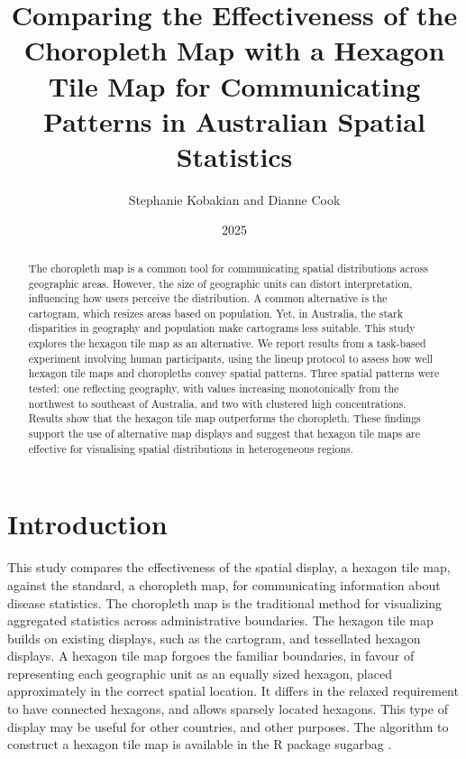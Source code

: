 \documentclass[
doublespace,
  times]{anzsauth}
\title{Comparing the Effectiveness of the Choropleth Map with a Hexagon
Tile Map for Communicating Patterns in Australian Spatial Statistics}
\author{
Stephanie Kobakian\addressnum{1} and
Dianne Cook\addressnum{2}
}
\affiliation{
Queensland University of Technology and
Monash University
}
\date{2025}
\begin{document}
\begin{abstract}
The choropleth map is a common tool for communicating spatial
distributions across geographic areas. However, the size of geographic
units can distort interpretation, influencing how users perceive the
distribution. A common alternative is the cartogram, which resizes areas
based on population. Yet, in Australia, the stark disparities in
geography and population make cartograms less suitable. This study
explores the hexagon tile map as an alternative. We report results from
a task-based experiment involving human participants, using the lineup
protocol to assess how well hexagon tile maps and choropleths convey
spatial patterns. Three spatial patterns were tested: one reflecting
geography, with values increasing monotonically from the northwest to
southeast of Australia, and two with clustered high concentrations.
Results show that the hexagon tile map outperforms the choropleth. These
findings support the use of alternative map displays and suggest that
hexagon tile maps are effective for visualising spatial distributions in
heterogeneous regions.
\end{abstract}

          

\maketitle


\section{Introduction}\label{sec-introduction}

This study compares the effectiveness of the spatial display, a hexagon
tile map, against the standard, a choropleth map, for communicating
information about disease statistics. The choropleth map is the
traditional method for visualizing aggregated statistics across
administrative boundaries. The hexagon tile map builds on existing
displays, such as the cartogram, and tessellated hexagon displays. A
hexagon tile map forgoes the familiar boundaries, in favour of
representing each geographic unit as an equally sized hexagon, placed
approximately in the correct spatial location. It differs in the relaxed
requirement to have connected hexagons, and allows sparsely located
hexagons. This type of display may be useful for other countries, and
other purposes. The algorithm to construct a hexagon tile map is
available in the R package sugarbag \citep{sugarbag}.
\end{document}
